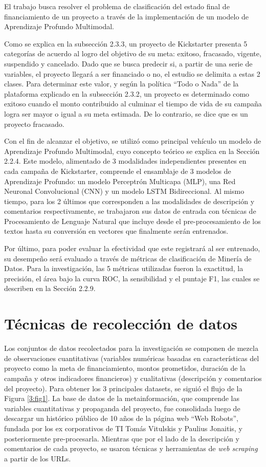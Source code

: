 El trabajo busca resolver el problema de clasificación del estado final de financiamiento de un proyecto a través de la implementación de un modelo de Aprendizaje Profundo Multimodal.

Como se explica en la subsección 2.3.3, un proyecto de Kickstarter presenta 5 categorías de acuerdo al logro del objetivo de su meta: exitoso, fracasado, vigente, suspendido y cancelado. Dado que se busca predecir si, a partir de una serie de variables, el proyecto llegará a ser financiado o no, el estudio se delimita a estas 2 clases. Para determinar este valor, y según la política “Todo o Nada” de la plataforma explicado en la subsección 2.3.2, un proyecto es determinado como exitoso cuando el monto contribuido al culminar el tiempo de vida de su campaña logra ser mayor o igual a su meta estimada. De lo contrario, se dice que es un proyecto fracasado.

Con el fin de alcanzar el objetivo, se utilizó como principal vehículo un modelo de Aprendizaje Profundo Multimodal, cuyo concepto teórico se explica en la Sección 2.2.4. Este modelo, alimentado de 3 modalidades independientes presentes en cada campaña de Kickstarter, comprende el ensamblaje de 3 modelos de Aprendizaje Profundo: un modelo Perceptrón Multicapa (MLP), una Red Neuronal Convolucional (CNN) y un modelo LSTM Bidireccional. Al mismo tiempo, para los 2 últimos que corresponden a las modalidades de descripción y comentarios respectivamente, se trabajaron sus datos de entrada con técnicas de Procesamiento de Lenguaje Natural que incluye desde el pre-procesamiento de los textos hasta su conversión en vectores que finalmente serán entrenados.

Por último, para poder evaluar la efectividad que este registrará al ser entrenado, su desempeño será evaluado a través de métricas de clasificación de Minería de Datos. Para la investigación, las 5 métricas utilizadas fueron la exactitud, la precisión, el área bajo la curva ROC, la sensibilidad y el puntaje F1, las cuales se describen en la Sección 2.2.9.

\section{Técnicas de recolección de datos}
Los conjuntos de datos recolectados para la investigación se componen de mezcla de observaciones cuantitativas (variables numéricas basadas en características del proyecto como la meta de financiamiento, montos prometidos, duración de la campaña y otros indicadores financieros) y cualitativas (descripción y comentarios del proyecto). Para obtener los 3 principales datasets, se siguió el flujo de la Figura \ref{3:fig1}. La base de datos de la metainformación, que comprende las variables cuantitativas y propaganda del proyecto, fue consolidada luego de descargar un histórico público de 10 años de la página web “Web Robots”, fundada por los ex corporativos de TI Tomás Vitulskis y Paulius Jonaitis, y posteriormente pre-procesarla. Mientras que por el lado de la descripción y comentarios de cada proyecto, se usaron técnicas y herramientas de \textit{web scraping} a partir de los URLs.

